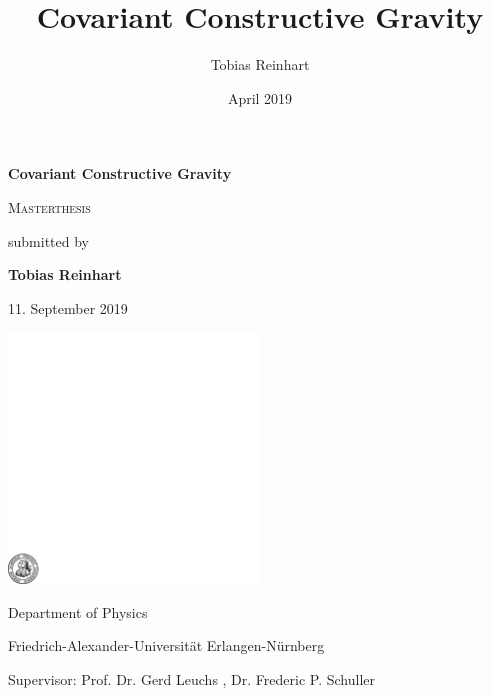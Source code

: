 \documentclass[a4paper,12pt, DIV=14, BCOR=5mm, twoside, headsepline, numbers=noenddot]{scrbook}
\title{Covariant Constructive Gravity}
\author{Tobias Reinhart }
\date{April 2019}
\begin{document}
\frontmatter

\begin{titlepage}
	\centering

	{\Huge\bfseries Covariant Constructive Gravity\par}
	\vspace{2cm}
	
	{\scshape\Large Masterthesis \par}
	\vspace{1cm}
	{ submitted by \par}
	
	
	
	{\bfseries Tobias Reinhart\par}
		{ 11. September 2019\par}
	\vspace{2cm}
	
	\includegraphics[width=0.5\textwidth]{fau-siegel.pdf}\par
	\vspace{1cm}Department of Physics\par
	Friedrich-Alexander-Universität Erlangen-Nürnberg\par
	Supervisor: Prof. Dr. Gerd Leuchs , Dr. Frederic P. Schuller
	
	\vfill
\end{titlepage}
\end{document}
